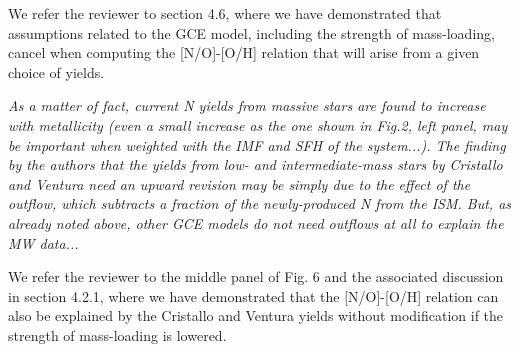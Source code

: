 \documentclass[12pt]{article}
\newcommand\doublebreak[0]{\par\null\par\noindent}
\begin{document}
\doublebreak
We refer the reviewer to section 4.6, where we have demonstrated that
assumptions related to the GCE model, including the strength of mass-loading,
cancel when computing the [N/O]-[O/H] relation that will arise from a given
choice of yields.
\doublebreak
\textit{%
As a matter of fact, current N yields from massive stars are found to increase
with metallicity (even a small increase as the one shown in Fig.2, left panel,
may be important when weighted with the IMF and SFH of the system...).
The finding by the authors that the yields from low- and intermediate-mass
stars by Cristallo and Ventura need an upward revision may be simply due to the
effect of the outflow, which subtracts a fraction of the newly-produced N from
the ISM. But, as already noted above, other GCE models do not need outflows at
all to explain the MW data...
}
\doublebreak
We refer the reviewer to the middle panel of Fig. 6 and the associated
discussion in section 4.2.1, where we have demonstrated that the [N/O]-[O/H]
relation can also be explained by the Cristallo and Ventura yields
without modification if the strength of mass-loading is lowered.
\end{document}
